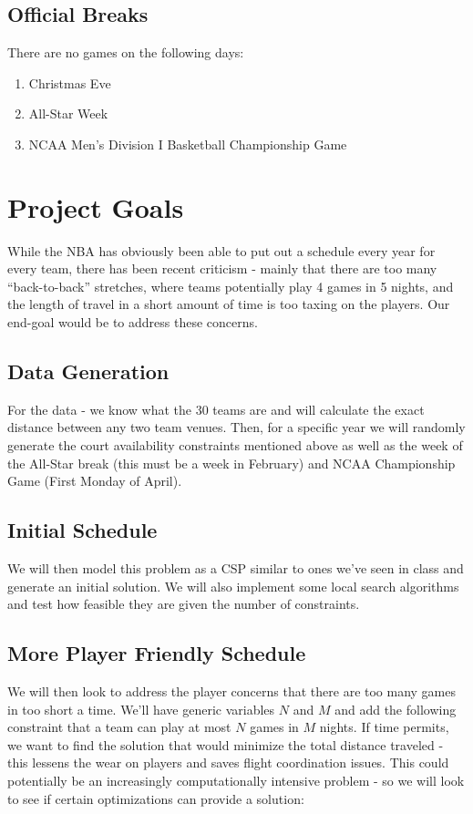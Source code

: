 \documentclass{article}
\begin{document}
	\subsection{Official Breaks}

	There are no games on the following days:

	\begin{enumerate}
		\item Christmas Eve
		\item All-Star Week
		\item NCAA Men's Division I Basketball Championship Game
	\end{enumerate}	
	
	\section{Project Goals}

	While the NBA has obviously been able to put out a schedule every year for every team, there has been recent criticism - mainly that there are too many ``back-to-back'' stretches, where teams potentially play 4 games in 5 nights, and the length of travel in a short amount of time is too taxing on the players. Our end-goal would be to address these concerns.
	
	\subsection{Data Generation}
	For the data - we know what the 30 teams are and will calculate the exact distance between any two team venues. Then, for a specific year we will randomly generate the court availability constraints mentioned above as well as the week of the All-Star break (this must be a week in February) and NCAA Championship Game (First Monday of April).

	\subsection{Initial Schedule}
	We will then model this problem as a CSP similar to ones we've seen in class and generate an initial solution. We will also implement some local search algorithms and test how feasible they are given the number of constraints. 

	\subsection{More Player Friendly Schedule}
	We will then look to address the player concerns that there are too many games in too short a time. We'll have generic variables $N$ and $M$ and add the following constraint that a team can play at most $N$ games in $M$ nights.  If time permits, we want to find the solution that would minimize the total distance traveled - this lessens the wear on players and saves flight coordination issues. This could potentially be an increasingly computationally intensive problem - so we will look to see if certain optimizations can provide a solution:
\end{document}
